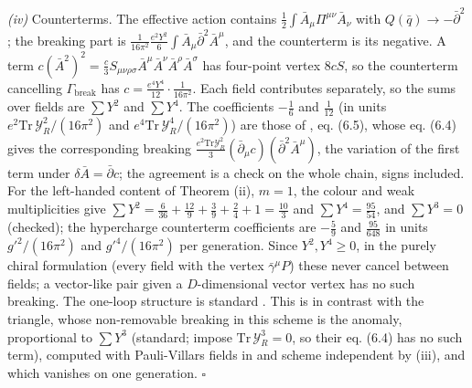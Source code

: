 \emph{(iv)} Counterterms. The effective action contains $\tfrac12\int\bar A_{\mu}\Pi^{\mu\nu}\bar A_{\nu}$ with $Q(\bar q) \to -\bar\partial^{2}$; the breaking part is $\tfrac{1}{16\pi^{2}}\tfrac{e^{2}Y^{2}}{6}\int\bar A_{\mu}\bar\partial^{2}\bar A^{\mu}$, and the counterterm is its negative. A term $c(\bar A^{2})^{2} = \tfrac{c}{3}S_{\mu\nu\rho\sigma}\bar A^{\mu}\bar A^{\nu}\bar A^{\rho}\bar A^{\sigma}$ has four-point vertex $8cS$, so the counterterm cancelling $\Gamma_{\mathrm{break}}$ has $c = \tfrac{e^{4}Y^{4}}{12}\cdot\tfrac{1}{16\pi^{2}}$. Each field contributes separately, so the sums over fields are $\sum Y^{2}$ and $\sum Y^{4}$. The coefficients $-\tfrac16$ and $\tfrac{1}{12}$ (in units $e^{2}\mathrm{Tr}\,\mathcal{Y}_{R}^{2}/(16\pi^{2})$ and $e^{4}\mathrm{Tr}\,\mathcal{Y}_{R}^{4}/(16\pi^{2})$) are those of \cite{BeluscaMaito2021}, eq. (6.5), whose eq. (6.4) gives the corresponding breaking $\tfrac{e^{2}\mathrm{Tr}\mathcal{Y}_{R}^{2}}{3}(\bar\partial_{\mu}c)(\bar\partial^{2}\bar A^{\mu})$, the variation of the first term under $\delta\bar A = \bar\partial c$; the agreement is a check on the whole chain, signs included. For the left-handed content of Theorem (ii), $m = 1$, the colour and weak multiplicities give $\sum Y^{2} = \tfrac{6}{36} + \tfrac{12}{9} + \tfrac{3}{9} + \tfrac{2}{4} + 1 = \tfrac{10}{3}$ and $\sum Y^{4} = \tfrac{95}{54}$, and $\sum Y^{3} = 0$ (checked); the hypercharge counterterm coefficients are $-\tfrac59$ and $\tfrac{95}{648}$ in units $g'^{2}/(16\pi^{2})$ and $g'^{4}/(16\pi^{2})$ per generation. Since $Y^{2}, Y^{4} \geq 0$, in the purely chiral formulation (every field with the vertex $\bar\gamma^{\mu}P$) these never cancel between fields; a vector-like pair given a $D$-dimensional vector vertex has no such breaking. The one-loop structure is standard \cite{BeluscaMaito2020}. This is in contrast with the triangle, whose non-removable breaking in this scheme is the anomaly, proportional to $\sum Y^{3}$ (standard; \cite{BeluscaMaito2021} impose $\mathrm{Tr}\,\mathcal{Y}_{R}^{3} = 0$, so their eq. (6.4) has no such term), computed with Pauli-Villars fields in  and scheme independent by (iii), and which vanishes on one generation. $\square$
